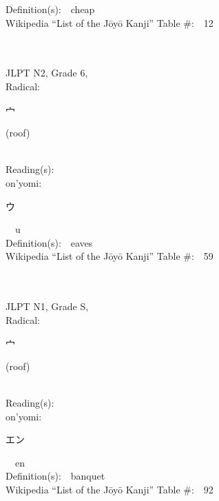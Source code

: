 \begin{multicols}{2}
Definition(s):\ \ cheap \\
Wikipedia ``List of the J\=oy\=o Kanji'' Table \#:\ \ 12 \\
\ \ \\
{\fontsize{34pt}{40pt}  }\ \ \\  %
{JLPT N2, Grade 6, \\Radical:\ \ {\begin{CJK}{UTF8}{min} 宀 \end{CJK}} (roof) } \\
Reading(s):\ \ \\
{\hspace*{1em}}on'yomi:\ \ \\
{\hspace*{2em}}{\begin{CJK}{UTF8}{min} ウ \end{CJK}}\ \ u\ \ \\
Definition(s):\ \ eaves \\
Wikipedia ``List of the J\=oy\=o Kanji'' Table \#:\ \ 59 \\
\ \ \\
{\fontsize{34pt}{40pt}  }\ \ \\
{JLPT N1, Grade S, \\Radical:\ \ {\begin{CJK}{UTF8}{min} 宀 \end{CJK}} (roof) } \\
Reading(s):\ \ \\
{\hspace*{1em}}on'yomi:\ \ \\
{\hspace*{2em}}{\begin{CJK}{UTF8}{min} エン \end{CJK}}\ \ en\ \ \\
Definition(s):\ \ banquet \\
Wikipedia ``List of the J\=oy\=o Kanji'' Table \#:\ \ 92 \\
\ \ \\
{\fontsize{34pt}{40pt}  }\ \ \\  %

\end{multicols}
